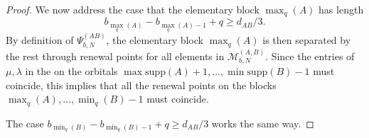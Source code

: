 \documentclass[10pt,a4paper]{amsart}
\begin{document}
\begin{proof}
	We now address the case that the elementary block $ \max_q(A) $ has length
	$$ b_{\max_q(A)}-b_{\max_q(A)-1}+q\geq d_{AB}/3. $$
	By definition of $\Psi_{b,N}^{(AB)}$, the elementary block $\max_q(A)$ is then separated by the rest through renewal points for all elements in $\mathcal{M}_{b,N}^{(A,B)}$. Since the entries of $\mu, \lambda$ in the on the orbitals $ \max \mathrm{supp}(A)+1, \dots ,  \min \mathrm{supp}(B)-1$ must coincide, this implies that all the renewal points on the blocks $\max_q(A), \dots , \min_q(B)-1$ must coincide.
	
	The case $ b_{\min_q(B)}-b_{\min_q(B)-1}+q\geq d_{AB}/3 $ works the same way.
\end{proof}
\end{document}
